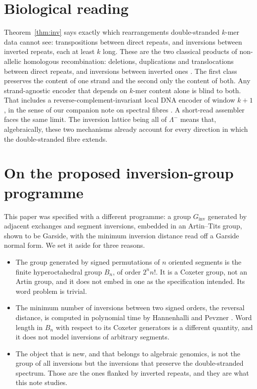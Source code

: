 \documentclass[11pt]{article}
\theoremstyle{plain}
\theoremstyle{definition}
\theoremstyle{remark}
\newcommand{\Lm}{\Lambda^{-}}
\begin{document}
\section{Biological reading}\label{sec:bio}

Theorem~\ref{thm:inv} says exactly which rearrangements double-stranded $k$-mer data cannot see:
transpositions between direct repeats, and inversions between inverted repeats, each at least $k$ long.
These are the two classical products of non-allelic homologous recombination: deletions,
duplications and translocations between direct repeats, and inversions between inverted ones
\cite{SL02}. The first class preserves the content of one strand and the second only the content of
both. Any strand-agnostic encoder that depends on $k$-mer content alone is blind to both. That includes
a reverse-complement-invariant local DNA encoder of window $k+1$, in the sense of our companion note on
spectral fibres \cite{CC26}. A short-read assembler faces the same limit. The inversion lattice being
all of $\Lm$ means that, algebraically, these two mechanisms already account for every direction in
which the double-stranded fibre extends.

\section{On the proposed inversion-group programme}\label{sec:programme}

This paper was specified with a different programme: a group $G_{\mathrm{inv}}$ generated by adjacent
exchanges and segment inversions, embedded in an Artin--Tits group, shown to be Garside, with the
minimum inversion distance read off a Garside normal form. We set it aside for three reasons.
\begin{itemize}
\item The group generated by signed permutations of $n$ oriented segments is the finite hyperoctahedral
group $B_n$, of order $2^nn!$. It is a Coxeter group, not an Artin group, and it does not embed in one
as the specification intended. Its word problem is trivial.
\item The minimum number of inversions between two signed orders, the reversal distance, is computed in
polynomial time by Hannenhalli and Pevzner \cite{HP99}. Word length in $B_n$ with respect to its
Coxeter generators is a different quantity, and it does not model inversions of arbitrary segments.
\item The object that is new, and that belongs to algebraic genomics, is not the group of all inversions
but the inversions that preserve the double-stranded spectrum. Those are the ones flanked by inverted
repeats, and they are what this note studies.
\end{itemize}
\end{document}
